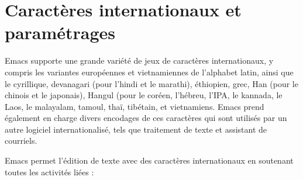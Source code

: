 \chapter{Caractères internationaux et paramétrages}
Emacs supporte une grande variété de jeux de caractères
internationaux, y compris les variantes européennes et vietnamiennes
de l'alphabet latin, ainsi que le cyrillique, devanagari (pour l'hindi
et le marathi), éthiopien, grec, Han (pour le chinois et le japonais),
Hangul (pour le coréen, l'hébreu, l'IPA, le kannada, le Laos, le
malayalam, tamoul, thaï, tibétain, et vietnamiens. Emacs prend
également en charge divers encodages de ces caractères qui sont
utilisés par un autre logiciel internationalisé, tels que traitement
de texte et assistant de courriels.

Emacs permet l'édition de texte avec des caractères internationaux en
soutenant toutes les activités liées :
